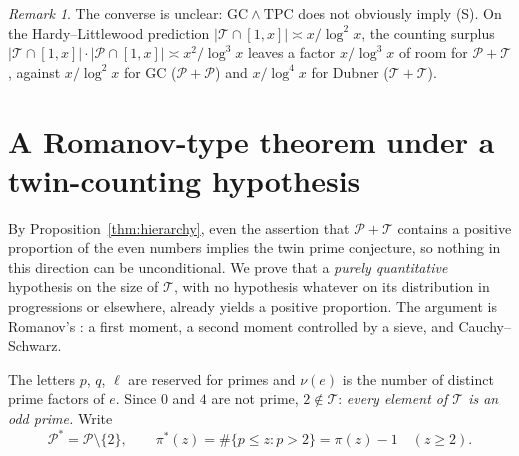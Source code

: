 \documentclass[10pt]{article}
\theoremstyle{definition}
\theoremstyle{remark}
\newtheorem{remark}{Remark}
\newcommand{\T}{\mathcal{T}}
\newcommand{\PP}{\mathcal{P}}
\begin{document}
\begin{remark}
The converse is unclear: $\mathrm{GC} \wedge \mathrm{TPC}$ does not obviously
imply (S). On the Hardy--Littlewood prediction
$|\T \cap [1,x]| \asymp x/\log^2 x$, the counting surplus
$|\T \cap [1,x]|\cdot|\PP \cap [1,x]| \asymp x^2/\log^3 x$ leaves a factor
$x/\log^3 x$ of room for $\PP + \T$, against $x/\log^2 x$ for GC
($\PP + \PP$) and $x/\log^4 x$ for Dubner ($\T + \T$).
\end{remark}

\section{A Romanov-type theorem under a twin-counting hypothesis}
\label{sec:romanov}

By Proposition~\ref{thm:hierarchy}, even the assertion that $\PP + \T$
contains a positive proportion of the even numbers implies the twin prime
conjecture, so nothing in this direction can be unconditional. We prove that a
\emph{purely quantitative} hypothesis on the size of $\T$, with no hypothesis
whatever on its distribution in progressions or elsewhere, already yields a
positive proportion. The argument is Romanov's \cite{Romanov}: a first moment,
a second moment controlled by a sieve, and Cauchy--Schwarz.

The letters $p$, $q$, $\ell$ are reserved for primes and $\nu(e)$ is the
number of distinct prime factors of $e$. Since $0$ and $4$ are not prime,
$2 \notin \T$: \emph{every element of $\T$ is an odd prime.} Write
\[
  \PP^{*} = \PP \setminus \{2\}, \qquad
  \pi^{*}(z) = \#\{p \le z : p > 2\} = \pi(z) - 1 \quad (z \ge 2).
\]
\end{document}
